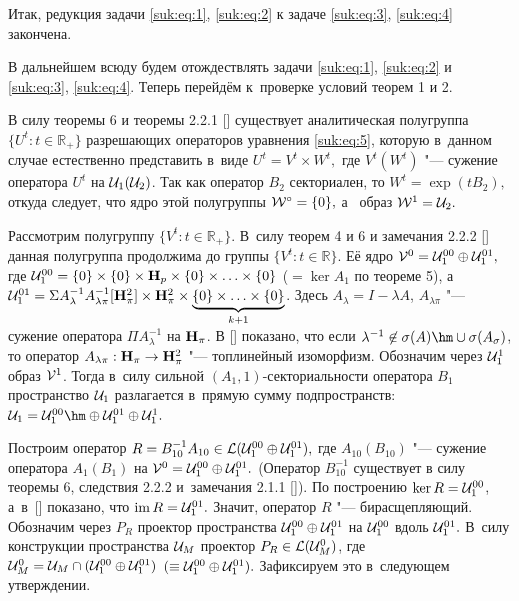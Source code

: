  \smallskip

Итак, редукция задачи \eqref{suk:eq:1}, \eqref{suk:eq:2}  к  задаче  \eqref{suk:eq:3},  \eqref{suk:eq:4} закончена.

{}
В  дальнейшем  всюду будем  отождествлять задачи  \eqref{suk:eq:1}, \eqref{suk:eq:2}  и  \eqref{suk:eq:3}, \eqref{suk:eq:4}.
Теперь  перейдём  к~проверке  условий теорем 1 и 2.

В силу теоремы 6 и теоремы 2.2.1 []  существует аналитическая полугруппа $\{ U^t: t \in {\mathbb R}_{+} \}$ разрешающих  операторов уравнения \eqref{suk:eq:5}, которую в~данном случае естественно представить в~виде  $U^t=V^t \times W^t ,$
где $V^t (W^t)$  "---    сужение оператора  $U^t$  на ${\cal U}_1 ({\cal U}_2)$. 
Так как оператор $B_2$ секториален,  то $W^t= \exp (tB_2),$ откуда следует, что ядро этой полугруппы $ {\cal W}^{\circ}= \{ 0 \} ,$ а~ образ $ {\cal W}^1={\cal U}_2.$

Рассмотрим полугруппу $\{ V^t: t \in {\mathbb R}_{+} \} .$ 
В~силу теорем 4 и 6 и замечания 2.2.2 [] данная полугруппа продолжима  до  группы $\{ V^t: t \in {\mathbb R} \} .$
Её ядро ${\cal V}^0={\cal U}_1^{00} \oplus {\cal U}_1^{01} ,$ где ${\cal U}_1^{00}=\{ 0 \} \times \{ 0 \} \times {\bf H}_p \times \{ 0 \} \times \ldots \times \{ 0\}$  ($=\ker A_1$ по теореме 5), а~${\cal U}_1^{01}=\Sigma A_{\lambda}^{-1}A_{\lambda  \pi}^{-1}
[{\bf H}_{\pi}^2] \times {\bf H}_{\pi}^2 \times \underbrace{\{ 0 \} \times \ldots \times \{ 0\}}_{k+1}$.
Здесь $A_{\lambda}=I- \lambda A$, $A_{\lambda \pi}$  "---   сужение оператора $\Pi A_{\lambda}^{-1}$ на ${\bf H}_{\pi}$.
В  []  показано,  что если ${\lambda}^{-1} \not\in \sigma (A)\hm \cup \sigma (A_{\sigma})$, то  оператор  $A_{\lambda  \pi}: {\bf H}_{\pi} \to {\bf H}_{\pi}^2$  "---  топлинейный изоморфизм.  
Обозначим  через  ${\cal U}_1^1$  образ ${\cal V}^1$.
Тогда   в~силу сильной $(A_1, 1)$-секториальности оператора $B_1 $ пространство ${\cal U}_1$ разлагается в~прямую сумму подпространств:
 ${\cal U}_1={\cal U}_1^{00} \hm \oplus {\cal U}_1^{01} \oplus {\cal U}_1^1 .$

Построим оператор $R=B_{10}^{-1}A_{10} \in {\cal L} ({\cal U}_1^{00}  \oplus {\cal U}_1^{01}) ,$
где $A_{10}(B_{10})$  "---  сужение оператора $A_1(B_1)$  на ${\cal V}^0={\cal U}_1^{00} \oplus {\cal U}_1^{01} .$
(Оператор $B^{-1}_{10}$ существует в силу  теоремы 6, следствия 2.2.2 и~замечания 2.1.1 []).
По  построению $\ker R={\cal U}_1^{00}$, а~в~[] показано, что ${\rm im}\,R={\cal U}_1^{01} .$ 
Значит, оператор  $R$  "---   бирасщепляющий.  
Обозначим через $P_R$  проектор пространства  ${\cal U}_1^{00} \oplus {\cal U}_1^{01}$  на   ${\cal U}_1^{00}$ вдоль  ${\cal U}_1^{01} .$
В~силу  конструкции пространства  ${\cal U}_M$  проектор  $P_R \in {\cal L} ({\cal U}^0_M)$,  где
${\cal U}^0_M={\cal U}_M \cap ({\cal U}_1^{00} \oplus {\cal U}_1^{01})$ $(\equiv
{\cal U}_1^{00} \oplus {\cal U}_1^{01}) .$ Зафиксируем  это  в~следующем утверждении.

